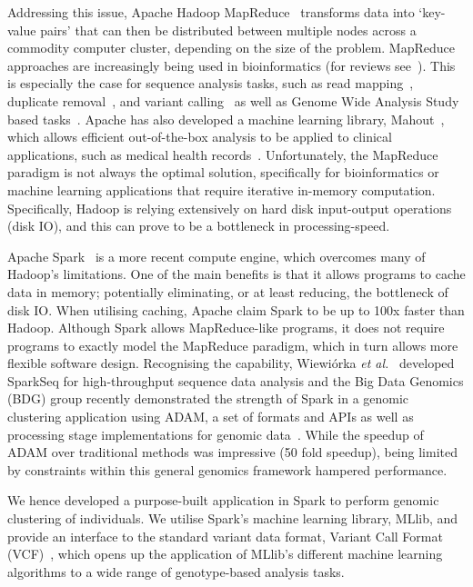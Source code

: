 \documentclass{bmcart}
\begin{document}
Addressing this issue, {\sc Apache Hadoop MapReduce}~\cite{Borthakur2007} transforms data into `key-value pairs' that can then be distributed between multiple nodes across a commodity computer cluster, depending on the size of the problem. 
MapReduce approaches are increasingly being used in bioinformatics (for reviews see~\cite{Zou2013, Qiu2010,Taylor2010}). 
This is especially the case for sequence analysis tasks, such as read mapping~\cite{Schatz2009}, duplicate removal~\cite{Jourdren2012}, and variant calling~\cite{Langmead2009, McKenna2010} as well as Genome Wide Analysis Study based tasks~\cite{Huang2013, Guo2014}. 
Apache has also developed a machine learning library, Mahout~\cite{Owen2011}, which allows efficient out-of-the-box analysis to be applied to clinical applications, such as medical health records~\cite{Ko2014}.
Unfortunately, the MapReduce paradigm is not always the optimal solution, specifically for bioinformatics or machine learning applications that require iterative in-memory computation. Specifically, Hadoop is relying extensively on hard disk input-output operations (disk IO), and this can prove to be a bottleneck in processing-speed.

{\sc Apache Spark}~\cite{Zaharia2011} is a more recent compute engine, which overcomes many of Hadoop's limitations. 
One of the main benefits is that it allows programs to cache data in memory; potentially eliminating, or at least reducing, the bottleneck of disk IO. 
When utilising caching, Apache claim {\sc Spark} to be up to 100x faster than Hadoop. 
Although {\sc Spark} allows MapReduce-like programs, it does not require programs to exactly model the MapReduce paradigm, which in turn allows more flexible software design. 
Recognising the capability, Wiewi{\'o}rka {\it et al.}~\cite{Wiewiorka2014} developed {\sc SparkSeq} for high-throughput sequence data analysis and the Big Data Genomics (BDG) group recently demonstrated the strength of {\sc Spark} in a genomic clustering application using {\sc ADAM}, a set of formats and APIs as well as processing stage implementations for genomic data~\cite{Massie2013}. 
While the speedup of {\sc ADAM} over traditional methods was impressive (50 fold speedup), being limited by constraints within this general genomics framework hampered performance. 

We hence developed a purpose-built application in {\sc Spark} to perform genomic clustering of individuals. 
We utilise {\sc Spark}'s machine learning library, \mbox{MLlib}, and provide an interface to the standard variant data format, Variant Call Format (VCF)~\cite{1KG2012}, which opens up the application of MLlib's different machine learning algorithms to a wide range of genotype-based analysis tasks. 
\end{document}
